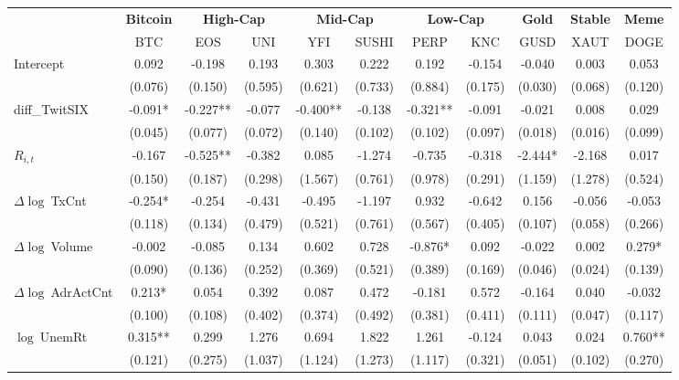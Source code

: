 \begin{table}[ht]
\centering
\scriptsize
\setlength{\tabcolsep}{4pt}
\begin{tabular}{l *{10}{c}}
\toprule
&\multicolumn{1}{c}{\textbf{Bitcoin}}&\multicolumn{2}{c}{\textbf{High-Cap}}&\multicolumn{2}{c}{\textbf{Mid-Cap}}&\multicolumn{2}{c}{\textbf{Low-Cap}}&\multicolumn{1}{c}{\textbf{Gold}}&\multicolumn{1}{c}{\textbf{Stable}}&\multicolumn{1}{c}{\textbf{Meme}}\\
\addlinespace
 & BTC & EOS & UNI & YFI & SUSHI & PERP & KNC & GUSD & XAUT & DOGE \\
\midrule
Intercept & 0.092 & -0.198 & 0.193 & 0.303 & 0.222 & 0.192 & -0.154 & -0.040 & 0.003 & 0.053 \\
 & (0.076) & (0.150) & (0.595) & (0.621) & (0.733) & (0.884) & (0.175) & (0.030) & (0.068) & (0.120) \\
\addlinespace
diff_TwitSIX & -0.091* & -0.227** & -0.077 & -0.400** & -0.138 & -0.321** & -0.091 & -0.021 & 0.008 & 0.029 \\
 & (0.045) & (0.077) & (0.072) & (0.140) & (0.102) & (0.102) & (0.097) & (0.018) & (0.016) & (0.099) \\
\addlinespace
$R_{i,t}$ & -0.167 & -0.525** & -0.382 & 0.085 & -1.274 & -0.735 & -0.318 & -2.444* & -2.168 & 0.017 \\
 & (0.150) & (0.187) & (0.298) & (1.567) & (0.761) & (0.978) & (0.291) & (1.159) & (1.278) & (0.524) \\
\addlinespace
$\Delta\log\ $TxCnt & -0.254* & -0.254 & -0.431 & -0.495 & -1.197 & 0.932 & -0.642 & 0.156 & -0.056 & -0.053 \\
 & (0.118) & (0.134) & (0.479) & (0.521) & (0.761) & (0.567) & (0.405) & (0.107) & (0.058) & (0.266) \\
\addlinespace
$\Delta\log\ $Volume & -0.002 & -0.085 & 0.134 & 0.602 & 0.728 & -0.876* & 0.092 & -0.022 & 0.002 & 0.279* \\
 & (0.090) & (0.136) & (0.252) & (0.369) & (0.521) & (0.389) & (0.169) & (0.046) & (0.024) & (0.139) \\
\addlinespace
$\Delta\log\ $AdrActCnt & 0.213* & 0.054 & 0.392 & 0.087 & 0.472 & -0.181 & 0.572 & -0.164 & 0.040 & -0.032 \\
 & (0.100) & (0.108) & (0.402) & (0.374) & (0.492) & (0.381) & (0.411) & (0.111) & (0.047) & (0.117) \\
\addlinespace
$\log\ $UnemRt & 0.315** & 0.299 & 1.276 & 0.694 & 1.822 & 1.261 & -0.124 & 0.043 & 0.024 & 0.760** \\
 & (0.121) & (0.275) & (1.037) & (1.124) & (1.273) & (1.117) & (0.321) & (0.051) & (0.102) & (0.270) \\

\end{tabular}
\end{table}
